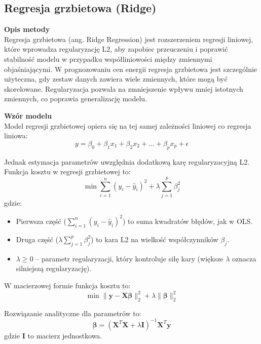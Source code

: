 \subsection{Regresja grzbietowa (Ridge)}

\textbf{Opis metody} \\
Regresja grzbietowa (ang. Ridge Regression) jest rozszerzeniem regresji liniowej, które wprowadza regularyzację L2, aby zapobiec przeuczeniu i poprawić stabilność modelu w przypadku współliniowości między zmiennymi objaśniającymi. W prognozowaniu cen energii regresja grzbietowa jest szczególnie użyteczna, gdy zestaw danych zawiera wiele zmiennych, które mogą być skorelowane. Regularyzacja pozwala na zmniejszenie wpływu mniej istotnych zmiennych, co poprawia generalizację modelu.

\textbf{Wzór modelu} \\
Model regresji grzbietowej opiera się na tej samej zależności liniowej co regresja liniowa:
\begin{equation}
y = \beta_0 + \beta_1 x_1 + \beta_2 x_2 + \dots + \beta_p x_p + \epsilon
\end{equation}

Jednak estymacja parametrów uwzględnia dodatkową karę regularyzacyjną L2. Funkcja kosztu w regresji grzbietowej to:
\begin{equation}
\min \sum_{i=1}^n (y_i - \hat{y}_i)^2 + \lambda \sum_{j=1}^p \beta_j^2
\end{equation}
gdzie:
\begin{itemize}
    \item Pierwsza część (\( \sum_{i=1}^n (y_i - \hat{y}_i)^2 \)) to suma kwadratów błędów, jak w OLS.
    \item Druga część (\( \lambda \sum_{j=1}^p \beta_j^2 \)) to kara L2 na wielkość współczynników \( \beta_j \).
    \item \( \lambda \geq 0 \) -- parametr regularyzacji, który kontroluje siłę kary (większe \( \lambda \) oznacza silniejszą regularyzację).
\end{itemize}

W macierzowej formie funkcja kosztu to:
\begin{equation}
\min \|\mathbf{y} - \mathbf{X} \boldsymbol{\beta}\|_2^2 + \lambda \|\boldsymbol{\beta}\|_2^2
\end{equation}

Rozwiązanie analityczne dla parametrów to:
\begin{equation}
\boldsymbol{\beta} = (\mathbf{X}^T \mathbf{X} + \lambda \mathbf{I})^{-1} \mathbf{X}^T \mathbf{y}
\end{equation}
gdzie \( \mathbf{I} \) to macierz jednostkowa.

